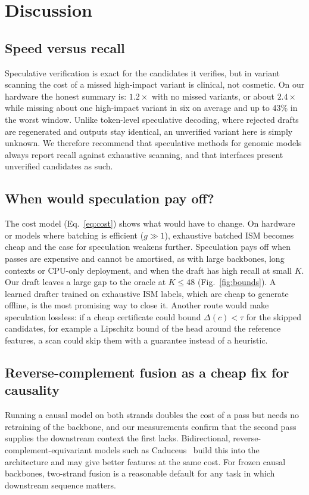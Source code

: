 \documentclass[conference]{IEEEtran}
\begin{document}
\section{Discussion}\label{sec:discussion}
\subsection{Speed versus recall}
Speculative verification is exact for the candidates it verifies, but in variant scanning the cost of a missed high-impact variant is clinical, not cosmetic. On our hardware the honest summary is: $1.2\times$ with no missed variants, or about $2.4\times$ while missing about one high-impact variant in six on average and up to 43\% in the worst window. Unlike token-level speculative decoding, where rejected drafts are regenerated and outputs stay identical, an unverified variant here is simply unknown. We therefore recommend that speculative methods for genomic models always report recall against exhaustive scanning, and that interfaces present unverified candidates as such.

\subsection{When would speculation pay off?}
The cost model (Eq.~\ref{eq:cost}) shows what would have to change. On hardware or models where batching is efficient ($g\gg1$), exhaustive batched ISM becomes cheap and the case for speculation weakens further. Speculation pays off when passes are expensive and cannot be amortised, as with large backbones, long contexts or CPU-only deployment, and when the draft has high recall at small $K$. Our draft leaves a large gap to the oracle at $K\le48$ (Fig.~\ref{fig:bounds}). A learned drafter trained on exhaustive ISM labels, which are cheap to generate offline, is the most promising way to close it. Another route would make speculation lossless: if a cheap certificate could bound $\Delta(c)<\tau$ for the skipped candidates, for example a Lipschitz bound of the head around the reference features, a scan could skip them with a guarantee instead of a heuristic.

\subsection{Reverse-complement fusion as a cheap fix for causality}
Running a causal model on both strands doubles the cost of a pass but needs no retraining of the backbone, and our measurements confirm that the second pass supplies the downstream context the first lacks. Bidirectional, reverse-complement-equivariant models such as Caduceus~\cite{schiff2024caduceus} build this into the architecture and may give better features at the same cost. For frozen causal backbones, two-strand fusion is a reasonable default for any task in which downstream sequence matters.
\end{document}
